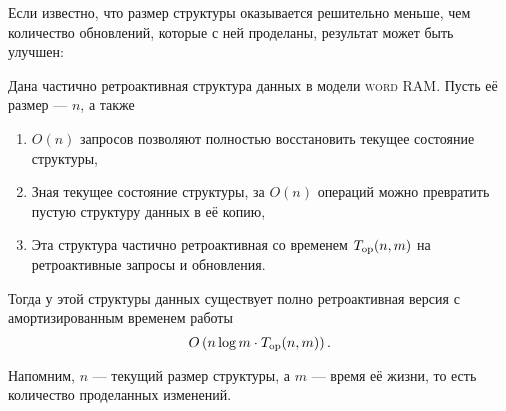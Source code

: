 Если известно, что размер структуры оказывается решительно меньше, чем количество обновлений, которые с ней проделаны, результат может быть улучшен:

\begin{theorem} \label{thm:logRetro}
	Дана частично ретроактивная структура данных в модели {\scshape word RAM}. Пусть её размер — $n$, а также
     \begin{enumerate}
	\item $O(n)$ запросов позволяют полностью восстановить текущее состояние структуры,
	\item Зная текущее состояние структуры, за $O(n)$ операций можно превратить пустую структуру данных в её копию,
	\item Эта структура частично ретроактивная со временем $T_{\mathrm{op}} (n,m)$ на ретроактивные запросы и обновления.
     \end{enumerate}

	Тогда у этой структуры данных существует полно ретроактивная версия с амортизированным временем работы
     \begin{equation*}
	O \left( n \log m \cdot T_{\mathrm{op}} (n,m) \right).
     \end{equation*}

	Напомним, $n$ — текущий размер структуры, а $m$ — время её жизни, то есть количество проделанных изменений.
\end{theorem}

